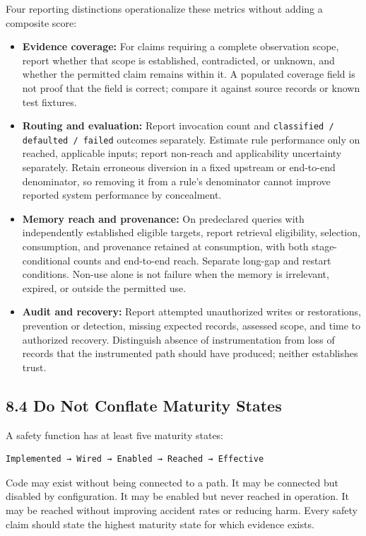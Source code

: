 Four reporting distinctions operationalize these metrics without adding a composite score:

\begin{itemize}
\tightlist
\item
  \textbf{Evidence coverage:} For claims requiring a complete observation scope, report whether that scope is established, contradicted, or unknown, and whether the permitted claim remains within it. A populated coverage field is not proof that the field is correct; compare it against source records or known test fixtures.
\item
  \textbf{Routing and evaluation:} Report invocation count and \passthrough{\lstinline!classified / defaulted / failed!} outcomes separately. Estimate rule performance only on reached, applicable inputs; report non-reach and applicability uncertainty separately. Retain erroneous diversion in a fixed upstream or end-to-end denominator, so removing it from a rule's denominator cannot improve reported system performance by concealment.
\item
  \textbf{Memory reach and provenance:} On predeclared queries with independently established eligible targets, report retrieval eligibility, selection, consumption, and provenance retained at consumption, with both stage-conditional counts and end-to-end reach. Separate long-gap and restart conditions. Non-use alone is not failure when the memory is irrelevant, expired, or outside the permitted use.
\item
  \textbf{Audit and recovery:} Report attempted unauthorized writes or restorations, prevention or detection, missing expected records, assessed scope, and time to authorized recovery. Distinguish absence of instrumentation from loss of records that the instrumented path should have produced; neither establishes trust.
\end{itemize}

\subsection{8.4 Do Not Conflate Maturity States}\label{do-not-conflate-maturity-states}

A safety function has at least five maturity states:

\begin{lstlisting}
Implemented → Wired → Enabled → Reached → Effective
\end{lstlisting}

Code may exist without being connected to a path. It may be connected but disabled by configuration. It may be enabled but never reached in operation. It may be reached without improving accident rates or reducing harm. Every safety claim should state the highest maturity state for which evidence exists.

